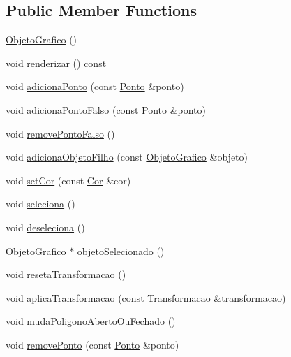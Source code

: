 \subsection*{Public Member Functions}
\begin{DoxyCompactItemize}
\item 
\hyperlink{classObjetoGrafico_aa9f60661f56d401ea452d1f816baf383}{Objeto\+Grafico} ()
\item 
void \hyperlink{classObjetoGrafico_a5724b1222c13566c383ef45afe509c1d}{renderizar} () const 
\item 
void \hyperlink{classObjetoGrafico_a53501fa66c3e01b16cb3b779ce49b3f2}{adiciona\+Ponto} (const \hyperlink{classPonto}{Ponto} \&ponto)
\item 
void \hyperlink{classObjetoGrafico_ac497e31bacfc78ab649d0141037e2e53}{adiciona\+Ponto\+Falso} (const \hyperlink{classPonto}{Ponto} \&ponto)
\item 
void \hyperlink{classObjetoGrafico_af503f951d52a753e5d585aedfe7a786d}{remove\+Ponto\+Falso} ()
\item 
void \hyperlink{classObjetoGrafico_aa3fe40175c540687c2f5fdc3cfcaaa5e}{adiciona\+Objeto\+Filho} (const \hyperlink{classObjetoGrafico}{Objeto\+Grafico} \&objeto)
\item 
void \hyperlink{classObjetoGrafico_a30c749fe307eb77a071dee9c5afa6901}{set\+Cor} (const \hyperlink{classCor}{Cor} \&cor)
\item 
void \hyperlink{classObjetoGrafico_a3abe25ee87595137e261644901c5433e}{seleciona} ()
\item 
void \hyperlink{classObjetoGrafico_a8fbcf1515b4c000086a0869f883a2649}{deseleciona} ()
\item 
\hyperlink{classObjetoGrafico}{Objeto\+Grafico} $\ast$ \hyperlink{classObjetoGrafico_a0b0e6b4b843662542c4e26237bc13311}{objeto\+Selecionado} ()
\item 
void \hyperlink{classObjetoGrafico_a32858f0dd61d1d4fa2a3450650448b0a}{reseta\+Transformacao} ()
\item 
void \hyperlink{classObjetoGrafico_ae943811015ea3f95985803868de59387}{aplica\+Transformacao} (const \hyperlink{classTransformacao}{Transformacao} \&transformacao)
\item 
void \hyperlink{classObjetoGrafico_a878a53888cfcac3083f02188029f41a6}{muda\+Poligono\+Aberto\+Ou\+Fechado} ()
\item 
void \hyperlink{classObjetoGrafico_a1583cd9219737af248fd81255b388e08}{remove\+Ponto} (const \hyperlink{classPonto}{Ponto} \&ponto)
\item 

\end{DoxyCompactItemize}
